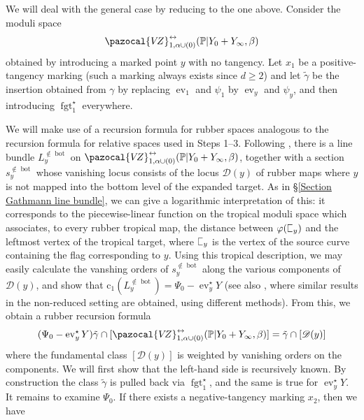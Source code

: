\documentclass[11pt]{amsart}
\newcommand{\sqC}{\scalebox{0.8}[1.3]{$\sqsubset$}}
\newcommand{\VZ}{\pazocal{V\!Z}}
\newcommand{\st}{\star}
\newcommand{\ev}{\operatorname{ev}}
\newcommand{\fgt}{\operatorname{fgt}}
\newcommand{\Dcal}{\mathcal{D}}
\newcommand{\cchern}{\mathrm{c}}
\theoremstyle{definition}
\theoremstyle{definition}
\begin{document}
We will deal with the general case by reducing to the one above. Consider the moduli space
\begin{equation*}\label{step 4 recursion space} \VZ^{\leftrightarrow}_{1,\alpha\cup (0)}(\mathbb P|Y_0+Y_\infty,\beta)\end{equation*}
obtained by introducing a marked point $y$ with no tangency. Let $x_1$ be a positive-tangency marking (such a marking always exists since $d \geq 2$) and let $\tilde\gamma$ be the insertion obtained from $\gamma$ by replacing $\ev_1$ and $\psi_1$ by $\ev_y$ and $\psi_y$, and then introducing $\fgt_{1}^\st$ everywhere.

We will make use of a recursion formula for rubber spaces analogous to the recursion formula for relative spaces used in Steps 1--3. Following \cite{EKatz}, there is a line bundle $L_y^{\not\in \operatorname{bot}}$ on $\VZ^{\leftrightarrow}_{1,\alpha\cup (0)}(\mathbb P|Y_0+Y_\infty,\beta)$, together with a section $s_y^{\not\in\operatorname{bot}}$ whose vanishing locus consists of the locus $\Dcal(y)$ of rubber maps where $y$ is not mapped into the bottom level of the expanded target. As in \S \ref{Section Gathmann line bundle}, we can give a logarithmic interpretation of this: it corresponds to the piecewise-linear function on the tropical moduli space which associates, to every rubber tropical map, the distance between $\varphi(\sqC_y)$ and the leftmost vertex of the tropical target, where $\sqC_y$ is the vertex of the source curve containing the flag corresponding to $y$. Using this tropical description, we may easily calculate the vanshing orders of $s_y^{\not\in\operatorname{bot}}$ along the various components of $\Dcal(y)$, and show that $\cchern_1(L_y^{\not\in\operatorname{bot}}) = \Psi_0 - \ev_y^\st Y$ (see also \cite{EKatzLB}, where similar results in the non-reduced setting are obtained, using different methods). From this, we obtain a rubber recursion formula
\begin{equation}\label{step 4 recursion} (\Psi_0 - \ev_y^\st Y) \tilde\gamma \cap [\VZ^{\leftrightarrow}_{1,\alpha\cup(0)}(\mathbb P|Y_0+Y_\infty,\beta)] = \tilde\gamma \cap [\Dcal(y)]\end{equation}
where the fundamental class $[\Dcal(y)]$ is weighted by vanishing orders on the components. We will first show that the left-hand side is recursively known. By construction the class $\tilde\gamma$ is pulled back via $\fgt_{1}^\st$, and the same is true for $\ev_y^\st Y$. It remains to examine $\Psi_0$. If there exists a negative-tangency marking $x_2$, then we have \cite[Construction 5.1.17]{GathmannThesis}
\end{document}
